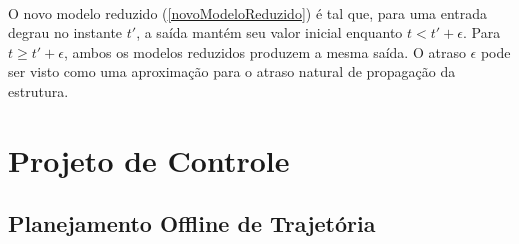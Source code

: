 \documentclass[a4paper,11pt]{scrartcl} %
\numberwithin{equation}{section} %
\numberwithin{figure}{section} %
\numberwithin{table}{section} %
\begin{document}
\paragraph{} O novo modelo reduzido (\ref{novoModeloReduzido}) é tal que, para uma entrada degrau no instante $t'$, a saída mantém seu valor inicial enquanto $t < t' + \epsilon$. Para $t \ge t' + \epsilon$, ambos os modelos reduzidos produzem a mesma saída. O atraso $\epsilon$ pode ser visto como uma aproximação para o atraso natural de propagação da estrutura.


\section{Projeto de Controle}
\subsection{Planejamento Offline de Trajetória}
\end{document}
